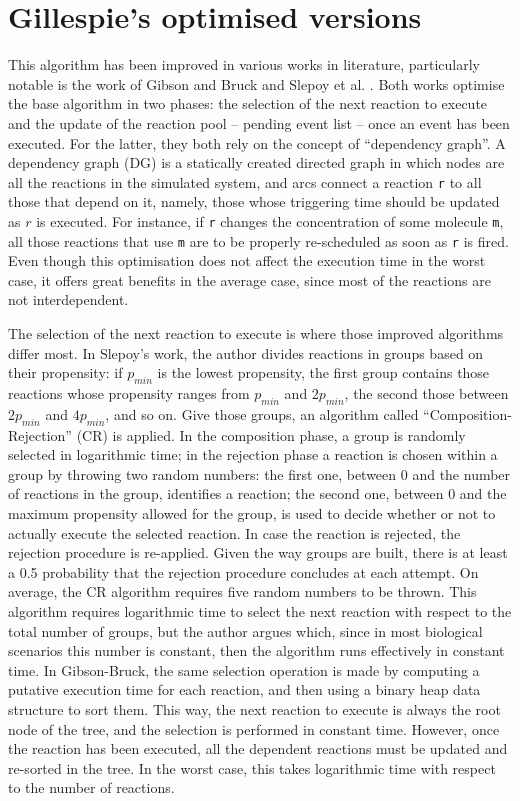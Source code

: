 \documentclass[12pt,a4paper,twoside,openright]{book}
\begin{document}
\section{Gillespie's optimised versions}
This algorithm has been improved in various works in literature, particularly notable is the work of Gibson and Bruck \cite{gibson2000} and Slepoy et al. \cite{slepoy2008}.
%
Both works optimise the base algorithm in two phases: the selection of the next reaction to execute and the update of the reaction pool -- pending event list -- once an event has been executed.
%
For the latter, they both rely on the concept of ``dependency graph''.
%
A dependency graph (DG) is a statically created directed graph in which nodes are all the reactions in the simulated system, and arcs connect a reaction \texttt{r} to all those that depend on it, namely, those whose triggering time should be updated as $r$ is executed.
%
For instance, if \texttt{r} changes the concentration of some molecule \texttt{m}, all those reactions that use \texttt{m} are to be properly re-scheduled as soon as \texttt{r} is fired.
%
Even though this optimisation does not affect the execution time in the worst case, it offers great benefits in the average case, since most of the reactions are not interdependent.

The selection of the next reaction to execute is where those improved algorithms differ most.
%
In Slepoy's work, the author divides reactions in groups based on their propensity: if $p_{min}$ is the lowest propensity, the first group contains those reactions whose propensity ranges from $p_{min}$ and $2 p_{min}$, the second those between $2 p_{min}$ and $4 p_{min}$, and so on.
%
Give those groups, an algorithm called ``Composition-Rejection'' (CR) is applied.
%
In the composition phase, a group is randomly selected in logarithmic time; in the rejection phase a reaction is chosen within a group by throwing two random numbers: the first one, between $0$ and the number of reactions in the group, identifies a reaction; the second one, between $0$ and the maximum propensity allowed for the group, is used to decide whether or not to actually execute the selected reaction.
%
In case the reaction is rejected, the rejection procedure is re-applied.
%
Given the way groups are built, there is at least a 0.5 probability that the rejection procedure concludes at each attempt.
%
On average, the CR algorithm requires five random numbers to be thrown.
%
This algorithm requires logarithmic time to select the next reaction with respect to the total number of groups, but the author argues which, since in most biological scenarios this number is constant, then the algorithm runs effectively in constant time.
%
In Gibson-Bruck, the same selection operation is made by computing a putative execution time for each reaction, and then using a binary heap data structure to sort them.
%
This way, the next reaction to execute is always the root node of the tree, and the selection is performed in constant time.
%
However, once the reaction has been executed, all the dependent reactions must be updated and re-sorted in the tree. In the worst case, this takes logarithmic time with respect to the number of reactions.
\end{document}
